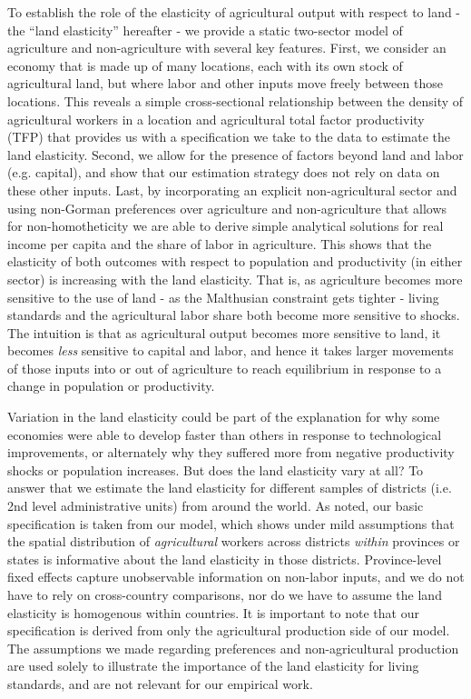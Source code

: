 \documentclass[11pt]{article}
\begin{document}
To establish the role of the elasticity of agricultural output with respect to land - the ``land elasticity'' hereafter - we provide a static two-sector model of agriculture and non-agriculture with several key features. First, we consider an economy that is made up of many locations, each with its own stock of agricultural land, but where labor and other inputs move freely between those locations. This reveals a simple cross-sectional relationship between the density of agricultural workers in a location and agricultural total factor productivity (TFP) that provides us with a specification we take to the data to estimate the land elasticity. Second, we allow for the presence of factors beyond land and labor (e.g. capital), and show that our estimation strategy does not rely on data on these other inputs. Last, by incorporating an explicit non-agricultural sector and using non-Gorman preferences over agriculture and non-agriculture that allows for non-homotheticity \citep{boppart2014} we are able to derive simple analytical solutions for real income per capita and the share of labor in agriculture. This shows that the elasticity of both outcomes with respect to population and productivity (in either sector) is increasing with the land elasticity. That is, as agriculture becomes more sensitive to the use of land - as the Malthusian constraint gets tighter - living standards and the agricultural labor share both become more sensitive to shocks. The intuition is that as agricultural output becomes more sensitive to land, it becomes \textit{less} sensitive to capital and labor, and hence it takes larger movements of those inputs into or out of agriculture to reach equilibrium in response to a change in population or productivity. 

Variation in the land elasticity could be part of the explanation for why some economies were able to develop faster than others in response to technological improvements, or alternately why they suffered more from negative productivity shocks or population increases. But does the land elasticity vary at all? To answer that we estimate the land elasticity for different samples of districts (i.e. 2nd level administrative units) from around the world. As noted, our basic specification is taken from our model, which shows under mild assumptions that the spatial distribution of \textit{agricultural} workers across districts \textit{within} provinces or states is informative about the land elasticity in those districts. Province-level fixed effects capture unobservable information on non-labor inputs, and we do not have to rely on cross-country comparisons, nor do we have to assume the land elasticity is homogenous within countries. It is important to note that our specification is derived from only the agricultural production side of our model. The assumptions we made regarding preferences and non-agricultural production are used solely to illustrate the importance of the land elasticity for living standards, and are not relevant for our empirical work.
\end{document}
